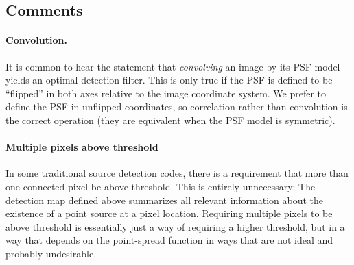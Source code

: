 \documentclass[letterpaper,preprint]{aastex}
\newcommand{\doctype}{paper}
\newcommand{\snr}[1]{\mathbb{SN}(#1)}
\newcommand{\norm}[1]{\left\lVert #1 \right\rVert}
\renewcommand{\vec}[1]{\boldsymbol{#1}}
\newcommand{\kvec}{\vec{k}}
\begin{document}


\subsection{Comments}

\paragraph{Convolution.}  It is common to hear the statement
that \emph{convolving} an image by its PSF model yields an optimal
detection filter.  This is only true if the PSF is defined to be
``flipped'' in both axes relative to the image coordinate system.  We
prefer to define the PSF in unflipped coordinates, so correlation
rather than convolution is the correct operation (they are equivalent
when the PSF model is symmetric).





\paragraph{Multiple pixels above threshold}
In some traditional source detection codes, there is a requirement
that more than one connected pixel be above threshold.  This is
entirely unnecessary: The detection map defined above summarizes all
relevant information about the existence of a point source at a pixel
location.  Requiring multiple pixels to be above threshold is
essentially just a way of requiring a higher threshold, but in a way
that depends on the point-spread function in ways that are not ideal
and probably undesirable.
\end{document}
